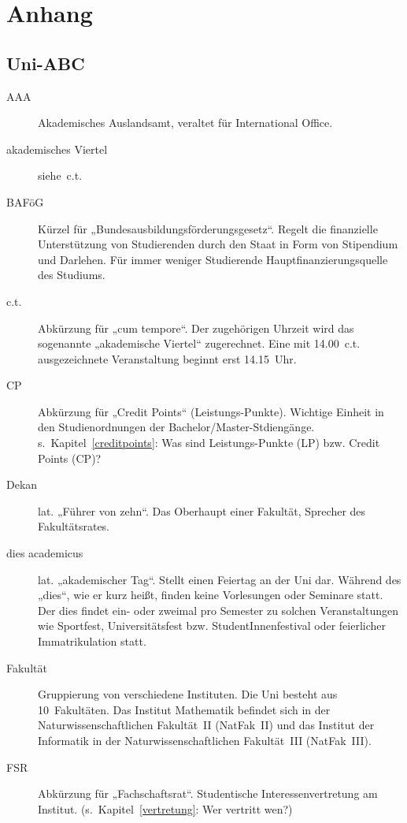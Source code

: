 
\section{Anhang}

\subsection{Uni-ABC}

\begin{description}
\item[AAA] Akademisches Auslandsamt, veraltet für International Office.
\item[akademisches Viertel] siehe~c.t.
\item[BAFöG] Kürzel für „Bundesausbildungsförderungsgesetz“.
             Regelt die finanzielle Unterstützung von Studierenden durch den Staat in Form von Stipendium und Darlehen.
             Für immer weniger Studierende Hauptfinanzierungsquelle des Studiums.
\item[c.t.] Abkürzung für „cum tempore“.
            Der zugehörigen Uhrzeit wird das sogenannte „akademische Viertel“ zugerechnet.
            Eine mit 14.00~c.t. ausgezeichnete Veranstaltung beginnt erst 14.15~Uhr.
\item[CP] Abkürzung für „Credit Points“ (Leistungs-Punkte). Wichtige Einheit in den Studienordnungen der Bachelor/Master-Stdiengänge.
          s.~Kapitel~\ref{creditpoints}: Was sind Leistungs-Punkte (LP) bzw. Credit Points (CP)?
\item[Dekan] lat. „Führer von zehn“. Das Oberhaupt einer Fakultät, Sprecher des Fakultätsrates.
\item[dies academicus] lat. „akademischer Tag“. Stellt einen Feiertag an der Uni dar.
                       Während des „dies“, wie er kurz heißt, finden keine Vorlesungen oder Seminare statt.
                       Der dies findet ein- oder zweimal pro Semester zu solchen Veranstaltungen wie Sportfest,
                       Universitätsfest bzw. StudentInnenfestival oder feierlicher Immatrikulation statt.
\item[Fakultät] Gruppierung von verschiedene Instituten. Die Uni besteht aus 10~Fakultäten.
                Das Institut Mathematik befindet sich in der Naturwissenschaftlichen Fakultät~II (NatFak~II)
                und das Institut der Informatik in der Naturwissenschaftlichen Fakultät~III (NatFak~III).
\item[FSR] Abkürzung für „Fachschaftsrat“. Studentische Interessenvertretung am Institut.
           (s.~Kapitel~\ref{vertretung}: Wer vertritt wen?)

\end{description}
